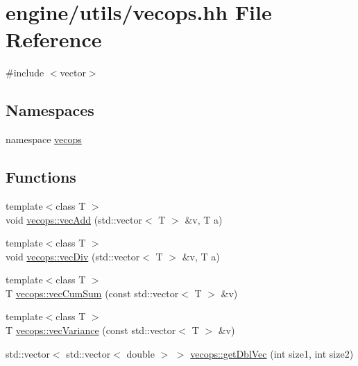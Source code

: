 \hypertarget{vecops_8hh}{
\section{engine/utils/vecops.hh File Reference}
\label{vecops_8hh}
}
{\ttfamily \#include $<$vector$>$}\par
\subsection*{Namespaces}
\begin{DoxyCompactItemize}
\item 
namespace \hyperlink{namespacevecops}{vecops}
\end{DoxyCompactItemize}
\subsection*{Functions}
\begin{DoxyCompactItemize}
\item 
{\footnotesize template$<$class T $>$ }\\void \hyperlink{namespacevecops_a7b580307abbce16deb2805fe8ba71373}{vecops::vecAdd} (std::vector$<$ T $>$ \&v, T a)
\item 
{\footnotesize template$<$class T $>$ }\\void \hyperlink{namespacevecops_acec04644239d63fa4a301827c628ce0d}{vecops::vecDiv} (std::vector$<$ T $>$ \&v, T a)
\item 
{\footnotesize template$<$class T $>$ }\\T \hyperlink{namespacevecops_a8cdfcdb8afb9e355fab4565c9a6293c1}{vecops::vecCumSum} (const std::vector$<$ T $>$ \&v)
\item 
{\footnotesize template$<$class T $>$ }\\T \hyperlink{namespacevecops_ae2720237efabb24d26fe4e96a96f13f7}{vecops::vecVariance} (const std::vector$<$ T $>$ \&v)
\item 
std::vector$<$ std::vector$<$ double $>$ $>$ \hyperlink{namespacevecops_abfba65305a1e0f1d0ef498b39c752f15}{vecops::getDblVec} (int size1, int size2)
\end{DoxyCompactItemize}

